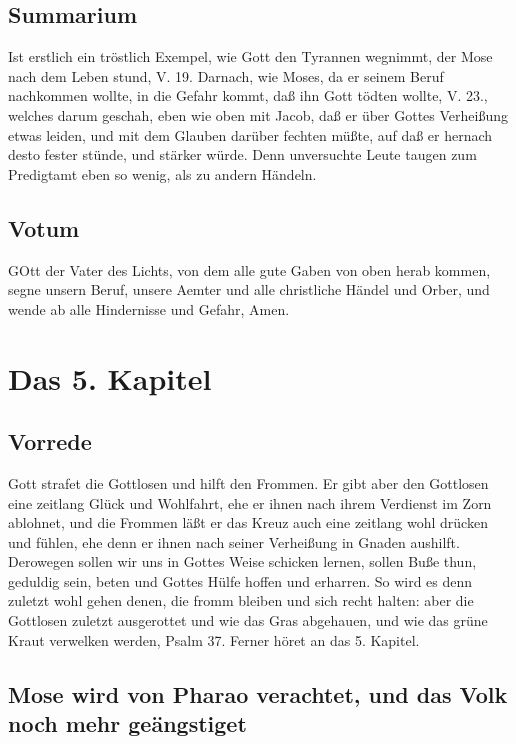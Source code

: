 \section{Summarium}

Ist erstlich ein tröstlich Exempel, wie Gott den Tyrannen wegnimmt, der Mose nach dem Leben stund, V. 19. Darnach, wie Moses, da er seinem Beruf nachkommen wollte, in die Gefahr kommt, daß ihn Gott tödten wollte, V. 23., welches darum geschah, eben wie oben mit Jacob, daß er über Gottes Verheißung etwas leiden, und mit dem Glauben darüber fechten müßte, auf daß er hernach desto fester stünde, und stärker würde. Denn unversuchte Leute taugen zum Predigtamt eben so wenig, als zu andern Händeln.

\section{Votum}

GOtt der Vater des Lichts, von dem alle gute Gaben von oben herab kommen, segne unsern Beruf, unsere Aemter und alle christliche Händel und Orber, und wende ab alle Hindernisse und Gefahr, Amen.

\chapter{Das 5. Kapitel}

\section{Vorrede}

Gott strafet die Gottlosen und hilft den Frommen. Er gibt aber den Gottlosen eine zeitlang Glück und Wohlfahrt, ehe er ihnen nach ihrem Verdienst im Zorn ablohnet, und die Frommen läßt er das Kreuz auch eine zeitlang wohl drücken und fühlen, ehe denn er ihnen nach seiner Verheißung in Gnaden aushilft. Derowegen sollen wir uns in Gottes Weise schicken lernen, sollen Buße thun, geduldig sein, beten und Gottes Hülfe hoffen und erharren. So wird es denn zuletzt wohl gehen denen, die fromm bleiben und sich recht halten: aber die Gottlosen zuletzt ausgerottet und wie das Gras abgehauen, und wie das grüne Kraut verwelken werden, Psalm 37. Ferner höret an das 5. Kapitel.

\section[Mose wird von Pharao verachtet, und das Volk]{Mose wird von Pharao verachtet, und das Volk noch mehr geängstiget}

